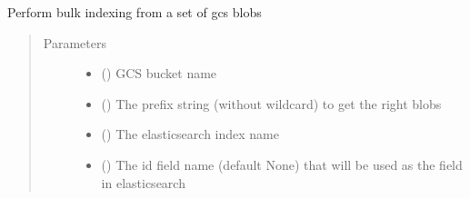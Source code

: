 \documentclass[letterpaper,10pt,english]{sphinxmanual}
\begin{document}
\begin{fulllineitems}
\label{\detokenize{omicidx.elasticsearch_utils:omicidx.elasticsearch_utils.bulk_index}}
\end{fulllineitems}


\begin{fulllineitems}
\label{\detokenize{omicidx.elasticsearch_utils:omicidx.elasticsearch_utils.bulk_index_from_gcs}}
Perform bulk indexing from a set of gcs blobs
\begin{quote}\begin{description}
\item[{Parameters}] \leavevmode\begin{itemize}
\item {} 
 () \textendash{} GCS bucket name

\item {} 
 () \textendash{} The prefix string (without wildcard) to get the right blobs

\item {} 
 () \textendash{} The elasticsearch index name

\item {} 
 () \textendash{} The id field name (default None) that will be used as the
 field in elasticsearch

\end{itemize}

\end{description}\end{quote}

\end{fulllineitems}
\end{document}
